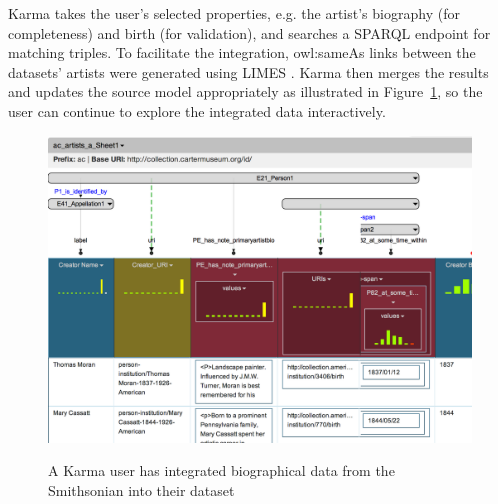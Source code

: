 Karma takes the user's selected properties, e.g. the artist's biography (for completeness) and birth (for validation), and searches a SPARQL endpoint for matching triples.
To facilitate the integration, owl:sameAs links between the datasets' artists were generated using LIMES \cite{ngomo2011limes}.
Karma then merges the results and updates the source model appropriately as illustrated in Figure~\ref{fig:augment-screenshot}, so the user can continue to explore the integrated data interactively. 

\begin{figure}
\begin{center}
\includegraphics[width=4.9in]{images/6-augment.png}
\vspace{-3mm}
\caption{A Karma user has integrated biographical data from the Smithsonian into their dataset}
\vspace{-2mm}
\label{fig:augment-screenshot}
\end{center}
\vspace{-1.5em}
\end{figure}
